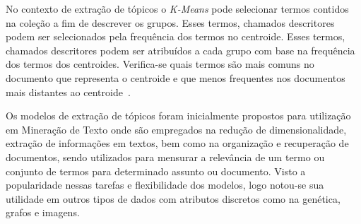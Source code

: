 No contexto de extração de tópicos o \textit{K-Means} pode selecionar termos contidos na coleção a fim de descrever os grupos. Esses termos, chamados descritores podem ser selecionados pela frequência dos termos no centroide. 
%
Esses termos, chamados descritores podem ser atribuídos a cada grupo com base na frequência dos termos dos centroides. Verifica-se quais termos são mais comuns no documento que representa o centroide e que menos frequentes nos documentos mais distantes ao centroide~\cite{Pema2017, Bui2017, Rossi2011, Santos2010a, Manning2008}. 

Os modelos de extração de tópicos foram inicialmente propostos para utilização em Mineração de Texto onde são empregados na redução de dimensionalidade, extração de informações em textos, bem como na organização e recuperação de documentos, sendo utilizados para mensurar a relevância de um termo ou conjunto de termos para determinado assunto ou documento. Visto a popularidade nessas tarefas e flexibilidade dos modelos, logo notou-se sua utilidade em outros tipos de dados com atributos discretos como na genética, grafos e imagens. 


